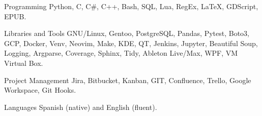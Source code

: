 

\begin{cvskills}

  \cvskill
    {Programming} %
    {Python, C, C\#, C++, Bash, SQL, Lua, RegEx, LaTeX, GDScript, EPUB.} %

  \cvskill
    {Libraries and Tools}
    {GNU/Linux, Gentoo, PostgreSQL, Pandas, Pytest, Boto3, GCP, Docker, Venv, Neovim, Make, KDE, QT, Jenkins,}
  \cvskill
    {}
    {Jupyter, Beautiful Soup, Logging, Argparse, Coverage, Sphinx, Tidy, Ableton Live/Max, WPF, VM Virtual Box.}

  \cvskill
    {Project Management}
    {Jira, Bitbucket, Kanban, GIT, Confluence, Trello, Google Workspace, Git Hooks.}

  \cvskill
    {Languages}
    {Spanish (native) and English (fluent).}


\end{cvskills}
